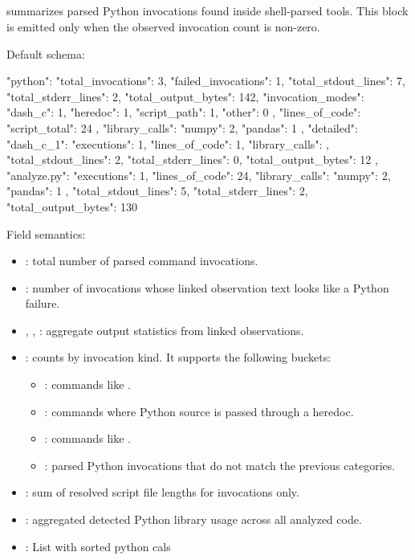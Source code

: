 \documentclass[11pt]{article}
\begin{document}
\subsection*{}

 summarizes parsed Python invocations found inside shell-parsed tools.
This block is emitted only when the observed invocation count is non-zero.

Default schema:

\begin{DocCode}
"python": {
  "total_invocations": 3,
  "failed_invocations": 1,
  "total_stdout_lines": 7,
  "total_stderr_lines": 2,
  "total_output_bytes": 142,
  "invocation_modes": {
    "dash_c": 1,
    "heredoc": 1,
    "script_path": 1,
    "other": 0
  },
  "lines_of_code": {
    "script_total": 24
  },
  "library_calls": {
    "numpy": 2,
    "pandas": 1
  },
  "detailed": {
    "dash_c_1": {
      "executions": 1,
      "lines_of_code": 1,
      "library_calls": {},
      "total_stdout_lines": 2,
      "total_stderr_lines": 0,
      "total_output_bytes": 12
    },
    "analyze.py": {
      "executions": 1,
      "lines_of_code": 24,
      "library_calls": {
        "numpy": 2,
        "pandas": 1
      },
      "total_stdout_lines": 5,
      "total_stderr_lines": 2,
      "total_output_bytes": 130
    }
  }
}
\end{DocCode}

Field semantics:
\begin{itemize}
\item {}: total number of parsed  command invocations.
\item {}: number of invocations whose linked observation text looks like a Python failure.
\item {}, , : aggregate output statistics from linked observations.
\item {}: counts by invocation kind. It supports the following buckets:
\begin{itemize}
\item {}: commands like .
\item {}: commands where Python source is passed through a heredoc.
\item {}: commands like .
\item {}: parsed Python invocations that do not match the previous categories.
\end{itemize}

\item {}: sum of resolved script file lengths for  invocations only.
\item {}: aggregated detected Python library usage across all analyzed code.
\item {}: List with sorted python cals
\end{itemize}
\end{document}
